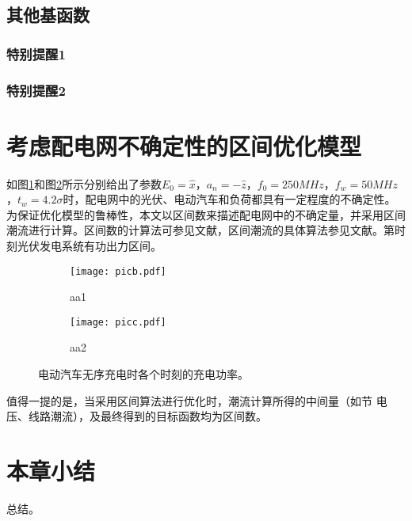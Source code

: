 \subsection{其他基函数}

\subsubsection{特别提醒1}

\subsubsection{特别提醒2}

\section{考虑配电网不确定性的区间优化模型}

如图\ref{picb}和图\ref{picc}所示分别给出了参数$E_0=\hat{x}$，$a_n=-\hat{z}$，$f_0=250MHz$，$f_w=50MHz$，$t_w=4.2\sigma$时，配电网中的光伏、电动汽车和负荷都具有一定程度的不确定性。为保证优化模型的鲁棒性，本文以区间数来描述配电网中的不确定量，并采用区间潮流进行计算。区间数的计算法可参见文献，区间潮流的具体算法参见文献。第时刻光伏发电系统有功出力区间。

\begin{figure}[h]
	\begin{subfigure}[b]{0.5\linewidth}
		\label{picb}
		\texttt{[image: picb.pdf]}
        \caption{aa1}
    \end{subfigure}
	\begin{subfigure}[b]{0.5\linewidth}
		\label{picc}
		\texttt{[image: picc.pdf]}
        \caption{aa2}
    \end{subfigure}
	\caption{电动汽车无序充电时各个时刻的充电功率。}
	\label{fig1}
\end{figure}

值得一提的是，当采用区间算法进行优化时，潮流计算所得的中间量（如节 电压、线路潮流），及最终得到的目标函数均为区间数。

\section{本章小结}
总结。
